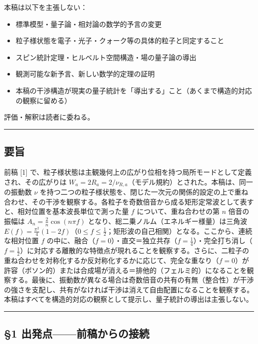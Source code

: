 \documentclass[
]{ltjsarticle}
\providecommand{\tightlist}{%
  \setlength{\itemsep}{0pt}\setlength{\parskip}{0pt}}
\begin{document}
本稿は以下を主張しない：

\begin{itemize}
\tightlist
\item
  標準模型・量子論・相対論の数学的予言の変更
\item
  粒子様状態を電子・光子・クォーク等の具体的粒子と同定すること
\item
  スピン統計定理・ヒルベルト空間構造・場の量子論の導出
\item
  観測可能な新予言、新しい数学的定理の証明
\item
  本稿の干渉構造が現実の量子統計を「導出する」こと（あくまで構造的対応の観察に留める）
\end{itemize}

評価・解釈は読者に委ねる。

\begin{center}\rule{0.5\linewidth}{0.5pt}\end{center}

\subsection{要旨}\label{ux8981ux65e8}

前稿 {[}1{]}
で、粒子様状態は主観幾何上の広がり位相を持つ局所モードとして定義され、その広がりは
\(W_a=2R_a=2/\nu_{R,a}\)（モデル規約）とされた。本稿は、同一の振動数
\(\nu\)
を持つ二つの粒子様状態を、閉じた一次元の関係的設定の上で重ね合わせ、その干渉を観察する。各粒子を奇数倍音から成る矩形定常波として表すと、相対位置を基本波長単位で測った量
\(f\) について、重ね合わせの第 \(n\) 倍音の振幅は
\(A_n=\tfrac{2}{n}\cos(n\pi f)\)
となり、総二乗ノルム（エネルギー様量）は三角波
\(E(f)=\tfrac{\pi^2}{4}(1-2f)\)（\(0\le f\le\tfrac12\)；矩形波の自己相関）となる。ここから、連続な相対位置
\(f\)
の中に、融合（\(f=0\)）・直交＝独立共存（\(f=\tfrac14\)）・完全打ち消し（\(f=\tfrac12\)）に対応する離散的な特徴点が現れることを観察する。さらに、二粒子の重ね合わせを対称化するか反対称化するかに応じて、完全な重なり（\(f=0\)）が許容（ボソン的）または合成場が消える＝排他的（フェルミ的）になることを観察する。最後に、振動数が異なる場合は奇数倍音の共有の有無（整合性）が干渉の強さを支配し、共有がなければ干渉は消えて自由配置になることを観察する。本稿はすべてを構造的対応の観察として提示し、量子統計の導出は主張しない。

\begin{center}\rule{0.5\linewidth}{0.5pt}\end{center}

\subsection{§1
出発点------前稿からの接続}\label{ux51faux767aux70b9ux524dux7a3fux304bux3089ux306eux63a5ux7d9a}
\end{document}
